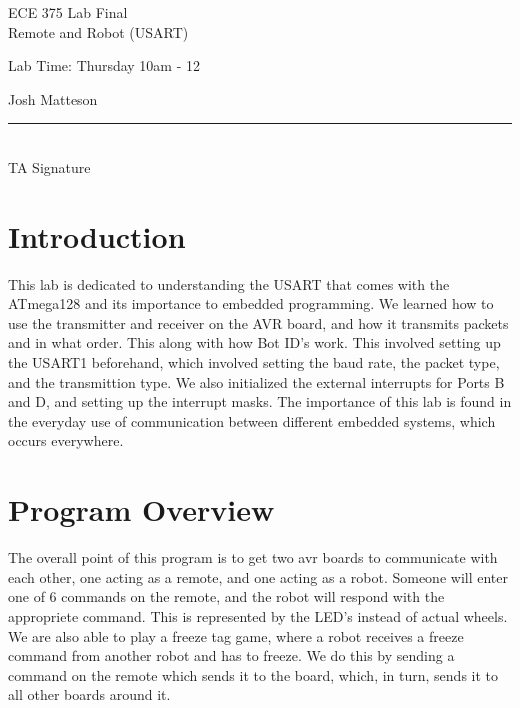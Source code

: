 \documentclass[12pt,letterpaper]{article}
\begin{document}
\begin{titlepage}
    \vspace*{4cm}
    \begin{flushright}
    {\huge
        ECE 375 Lab Final\\[1cm]
    }
    {\large
        Remote and Robot (USART)
    }
    \end{flushright}
    \begin{flushleft}
    Lab Time: Thursday 10am - 12
    \end{flushleft}
    \begin{flushright}
    Josh Matteson
    \vfill
    \rule{5in}{.5mm}\\
    TA Signature
    \end{flushright}

\end{titlepage}

\section{Introduction}
This lab is dedicated to understanding the USART that comes with the ATmega128 and its importance to embedded programming. We learned how to use the transmitter 
and receiver on the AVR board, and how it transmits packets and in what order. This along with how Bot ID's work. This involved setting up the USART1 beforehand,
which involved setting the baud rate, the packet type, and the transmittion type. We also initialized the external interrupts for Ports B and D, and setting up the 
interrupt masks. The importance of this lab is found in the everyday use of communication between different embedded systems, which occurs everywhere. 

\section{Program Overview}
{\noindent The overall point of this program is to get two avr boards to communicate with each other, one acting as a remote, and one acting as a robot. Someone 
will enter one of 6 commands on the remote, and the robot will respond with the appropriete command. This is represented by the LED's instead of actual wheels. 
We are also able to play a freeze tag game, where a robot receives a freeze command from another robot and has to freeze. We do this by sending a command on the 
remote which sends it to the board, which, in turn, sends it to all other boards around it.  \par}
\end{document}
